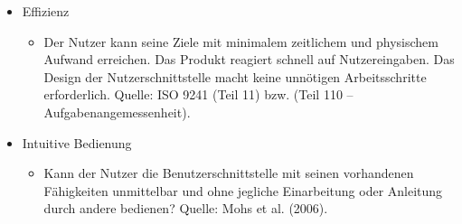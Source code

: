 \begin{itemize}
    \item Effizienz
    \begin{itemize}
        \item Der Nutzer kann seine Ziele mit minimalem zeitlichem und physischem Aufwand
        erreichen. Das Produkt reagiert schnell auf Nutzereingaben. Das Design der
        Nutzerschnittstelle macht keine unnötigen Arbeitsschritte erforderlich. Quelle: ISO 9241
        (Teil 11) bzw. (Teil 110 – Aufgabenangemessenheit).
    \end{itemize}
    \item Intuitive Bedienung
    \begin{itemize}
        \item Kann der Nutzer die Benutzerschnittstelle mit seinen vorhandenen
        Fähigkeiten unmittelbar und ohne jegliche Einarbeitung oder Anleitung durch andere
        bedienen? Quelle: Mohs et al. (2006).
    \end{itemize}

\end{itemize}
